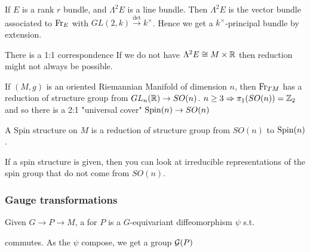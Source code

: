 \documentclass{article}
\begin{document}
\begin{example}
If $E$ is a rank $r$ bundle, and $\Lambda^2 E$ is a line bundle. Then $\Lambda^2 E$ is the vector bundle associated to $\operatorname{Fr}_E$ with $GL(2,k) \overset{\det}{\to} k^\times$. Hence we get a $k^\times$-principal bundle by extension. 
\end{example}

\begin{example}
There is a 1:1 correspondence 
If we do not have $\Lambda^2 E \cong M \times \mathbb{R}$ then reduction might not always be possible. 
\end{example}


\begin{example}
If $(M,g)$ is an oriented Riemannian Manifold of dimension $n$, then $\operatorname{Fr}_{TM}$ has a reduction of structure group from $GL_n(\mathbb{R}) \to SO(n)$. $ n \geq 3 \Rightarrow \pi_1(SO(n)) = \mathbb{Z}_2$ and so there is a 2:1 "universal cover" $\operatorname{Spin}(n) \to SO(n)$
\end{example}

\begin{definition}
A Spin structure on $M$ is a reduction of structure group from $SO(n)$ to $\operatorname{Spin}(n)$. 
\end{definition}

If a spin structure is given, then you can look at irreducible representations of the spin group that do not come from $SO(n)$. 


\subsubsection{Gauge transformations}

\begin{definition}
Given $G \to P \to M$, a  for $P$ is a $G$-equivariant diffeomorphism $\psi$ s.t. 

\begin{center}
\end{center}
commutes. As the $\psi$ compose, we get a group $\mathcal{G}(P)$
\end{definition}
\end{document}
